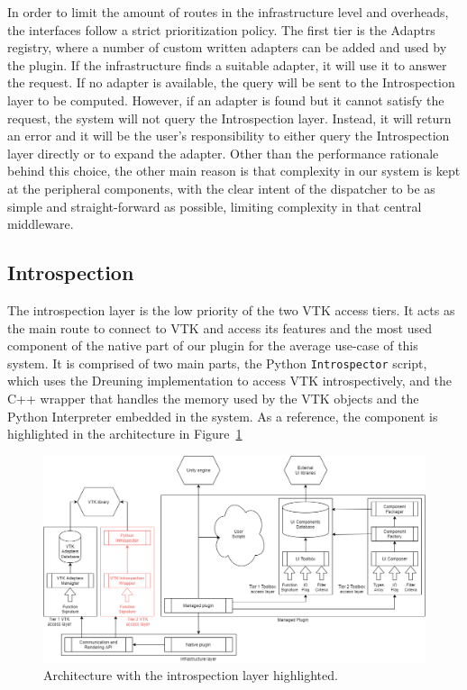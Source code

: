In order to limit the amount of routes in the infrastructure level and overheads, the interfaces follow a strict prioritization policy. The first tier is the Adaptrs registry, where a number of custom written adapters can be added and used by the plugin. If the infrastructure finds a suitable adapter, it will use it to answer the request. If no adapter is available, the query will be sent to the Introspection layer to be computed. However, if an adapter is found but it cannot satisfy the request, the system will not query the Introspection layer. Instead, it will return an error and it will be the user's responsibility to either query the Introspection layer directly or to expand the adapter. Other than the performance rationale behind this choice, the other main reason is that complexity in our system is kept at the peripheral components, with the clear intent of the dispatcher to be as simple and straight-forward as possible, limiting complexity in that central middleware.

\subsection{Introspection}
\label{sec:design-introspection}

The introspection layer is the low priority of the two VTK access tiers. It acts as the main route to connect to VTK and access its features and the most used component of the native part of our plugin for the average use-case of this system. It is comprised of two main parts, the Python \verb|Introspector| script, which uses the Dreuning implementation to access VTK introspectively, and the C++ wrapper that handles the memory used by the VTK objects and the Python Interpreter embedded in the system. As a reference, the component is highlighted in the architecture in Figure~\ref{fig:arch-intro}

\begin{figure}
    \centering
    \includegraphics[width=\textwidth]{pictures/Architecture-v0.3-intro.png}
    \caption{Architecture with the introspection layer highlighted.}
    \label{fig:arch-intro}
\end{figure}

